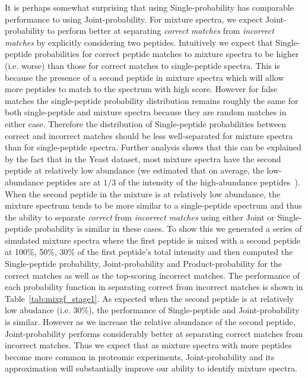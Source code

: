 \documentclass[runningheads,a4paper]{llncs}
\begin{document}
It is perhaps somewhat surprising that using Single-probability has comparable performance to using Joint-probability.  For mixture spectra, we expect Joint-probability to perform better at separating \emph{correct matches} from \emph{incorrect matches} by explicitly considering two peptides. Intuitively we expect that Single-peptide probabilities for correct peptide matches to mixture spectra to be higher (i.e. worse) than those for correct matches to single-peptide spectra.  This is because the presence of a second peptide in mixture spectra which will allow more peptides to match to the spectrum with high score. However for false matches the single-peptide probability distribution remains roughly the same for both single-peptide and mixture spectra because they are random matches in either case.  Therefore the distribution of Single-peptide probabilities between correct and incorrect matches should be less well-separated for mixture spectra than for single-peptide spectra.  Further analysis shows that this can be explained by the fact that in the Yeast dataset, most mixture spectra have the second peptide at relatively low abundance (we estimated that on average, the low-abundance peptides are at $1/3$ of the intensity of the high-abundance peptides~\cite{wang2010msplit}).  When the second peptide in the mixture is at relatively low abundance, the mixture spectrum tends to be more similar to a single-peptide spectrum and thus the ability to separate \emph{correct} from \emph{incorrect matches} using either Joint or Single-peptide probability is similar in these cases.  To show this we generated a series of simulated mixture spectra where the first peptide is mixed with a second peptide at 100\%, 50\%, 30\% of the first peptide's total intensity and then computed the Single-peptide probability, Joint-probability and Product-probability for the correct matches as well as the top-scoring incorrect matches. The performance of each probability function in separating correct from incorrect matches is shown in Table~\ref{tab:mixgf_stage1}.  As expected when the second peptide is at relatively low abudance (i.e. 30\%), the performance of Single-peptide and Joint-probability is similar. However as we increase the relative abundance of the second peptide, Joint-probability performs considerably better at separating correct matches from incorrect matches.  Thus we expect that as mixture spectra with more peptides become more common in proteomic experiments, Joint-probability and its approximation will substantially improve our ability to identify mixture spectra.
\end{document}
